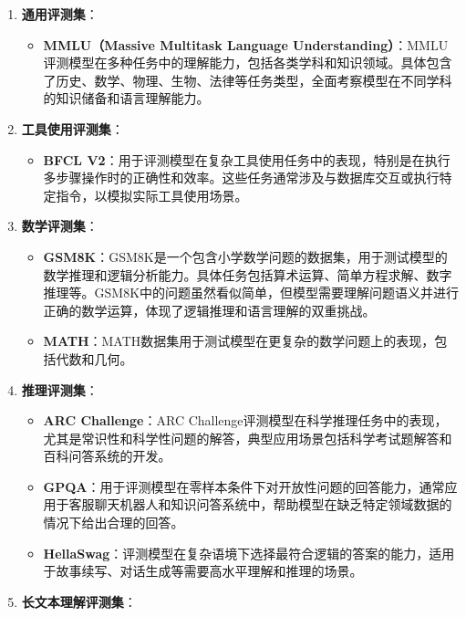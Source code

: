 \documentclass[
]{article}
\providecommand{\tightlist}{%
  \setlength{\itemsep}{0pt}\setlength{\parskip}{0pt}}
\begin{document}
\begin{enumerate}
\def\labelenumi{\arabic{enumi}.}
\tightlist
\item
  \textbf{通用评测集}：

  \begin{itemize}
  \tightlist
  \item
    \textbf{MMLU（Massive Multitask Language
    Understanding）}：MMLU评测模型在多种任务中的理解能力，包括各类学科和知识领域。具体包含了历史、数学、物理、生物、法律等任务类型，全面考察模型在不同学科的知识储备和语言理解能力。
  \end{itemize}
\item
  \textbf{工具使用评测集}：

  \begin{itemize}
  \tightlist
  \item
    \textbf{BFCL
    V2}：用于评测模型在复杂工具使用任务中的表现，特别是在执行多步骤操作时的正确性和效率。这些任务通常涉及与数据库交互或执行特定指令，以模拟实际工具使用场景。
  \end{itemize}
\item
  \textbf{数学评测集}：

  \begin{itemize}
  \tightlist
  \item
    \textbf{GSM8K}：GSM8K是一个包含小学数学问题的数据集，用于测试模型的数学推理和逻辑分析能力。具体任务包括算术运算、简单方程求解、数字推理等。GSM8K中的问题虽然看似简单，但模型需要理解问题语义并进行正确的数学运算，体现了逻辑推理和语言理解的双重挑战。
  \item
    \textbf{MATH}：MATH数据集用于测试模型在更复杂的数学问题上的表现，包括代数和几何。
  \end{itemize}
\item
  \textbf{推理评测集}：

  \begin{itemize}
  \tightlist
  \item
    \textbf{ARC Challenge}：ARC
    Challenge评测模型在科学推理任务中的表现，尤其是常识性和科学性问题的解答，典型应用场景包括科学考试题解答和百科问答系统的开发。
  \item
    \textbf{GPQA}：用于评测模型在零样本条件下对开放性问题的回答能力，通常应用于客服聊天机器人和知识问答系统中，帮助模型在缺乏特定领域数据的情况下给出合理的回答。
  \item
    \textbf{HellaSwag}：评测模型在复杂语境下选择最符合逻辑的答案的能力，适用于故事续写、对话生成等需要高水平理解和推理的场景。
  \end{itemize}
\item
  \textbf{长文本理解评测集}：


\end{enumerate}
\end{document}
